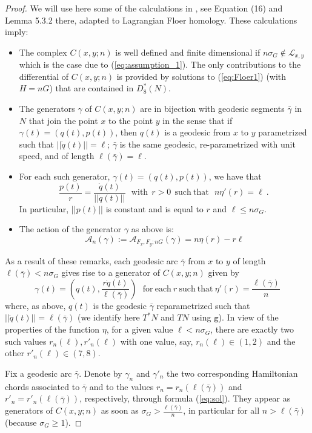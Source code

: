 \begin{proof}  We will use here some of the calculations in \cite{Bi-Po-Sa:Propagation}, see Equation (16) and  Lemma 5.3.2 there, adapted to Lagrangian Floer homology. These calculations imply:
\begin{itemize} 
\item[i.]  The complex $C(x,y;n)$ is well defined and finite dimensional if $n\sigma_{G}\not\in\mathcal{L}_{x,y}$ which is the case due to  (\ref{eq:assumption_1}). The only contributions to the differential of $C(x,y;n)$ is provided by solutions to (\ref{eq:Floer1})
(with $H=nG$) that are contained in $D^{\ast}_{8}(N)$. 
\item[ii.] The generators $\gamma$ of $C(x,y;n)$ are in bijection with geodesic segments $\bar{\gamma}$ in $N$ that join the point $x$ to the point $y$ in the sense that if $\gamma(t)=(q(t),p(t))$, then $q(t)$ is a geodesic from $x$ to $y$ parametrized such that $||\dot{q}(t)||=\ell$; $\bar{\gamma}$ is the same geodesic, re-parametrized with unit speed, and of length $\ell(\bar{\gamma})=\ell$. 
\item[iii.] For each such generator, $\gamma(t)=(q(t),p(t))$, we have that 
$$\frac{p(t)}{r}=\frac{\dot{q}(t)}{||\dot{q}(t)||}\ \ \ \mathrm{with}\ \  r>0\  \ \mathrm{such\ that}\ \ \  n\eta'(r)=\ell~.~$$ In particular, $||p(t)||$ is constant and is equal to $r$ and $\ell\leq n\sigma_{G}$.
\item[iv.] The action of the generator $\gamma$ as above is:
$$\mathcal{A}_{n}(\gamma):=\mathcal{A}_{F_{x},F_{y}; nG}(\gamma)=n\eta(r)- r\ell$$
\end{itemize}
As a result of these remarks, each geodesic arc $\bar{\gamma}$ from $x$ to $y$ 
of length $\ell(\bar{\gamma}) < n\sigma_{G}$ gives rise to a generator of 
$C(x,y;n)$ given by 
\begin{equation}\label{eq:sol}
\gamma(t)=(q(t),\frac{r\dot{q}(t)}{\ell(\bar{\gamma})})
\mathrm{\ \ \ for\ each}\  r\ \mathrm{such\ that\ } \eta'(r)=\frac{\ell(\bar{\gamma})}{n} 
\end{equation}
 where, as above,  $q(t)$ is the geodesic $\bar{\gamma}$ reparametrized such that $||\dot{q}(t)||=\ell(\bar{\gamma})$ (we identify here $T^{\ast}N$ and $TN$ using $\mathtt{g}$).
In view of the properties of the function $\eta$, for a given value $\ell < n\sigma_{G}$, there are exactly two such values $r_{n}(\ell), r'_{n}(\ell)$  with one value, say, $r_{n}(\ell)\in (1,2)$ and the other $r'_{n}(\ell)\in (7,8)$. 

Fix a geodesic arc $\bar{\gamma}$. Denote by $\gamma_{n}$ and $\gamma'_{n}$ the two corresponding Hamiltonian chords associated  to $\bar{\gamma}$ and to the values $r_{n}=r_{n}(\ell(\bar{\gamma}))$ and $r'_{n}=r'_{n}(\ell(\bar{\gamma}))$, respectively, through formula 
(\ref{eq:sol}). They appear as generators of $C(x,y;n)$ as soon as $\sigma_{G}>\frac{\ell(\bar{\gamma})}{n}$, in particular for all $n > \ell (\bar{\gamma})$
(because $\sigma_{G}\geq 1$). 


\end{proof}
